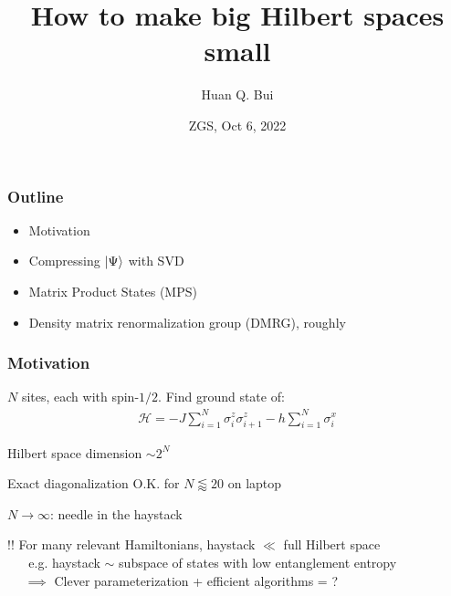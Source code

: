\documentclass{beamer}
\title[\textcolor{white}{{}}]
{
	How to make big Hilbert spaces small
}
\author[Bui] %
{Huan Q. Bui
	}
\institute[MIT] %
{
}
\date{ZGS, Oct 6, 2022}
\theoremstyle{definition}
\begin{document}
 
\frame{\titlepage}


\begin{frame}
	\frametitle{Outline}
	\begin{itemize}
		\item Motivation
		\item Compressing $\ket{\Psi}$ with SVD
		\item Matrix Product States (MPS)
		\item Density matrix renormalization group (DMRG), roughly
	\end{itemize}
\end{frame}


\begin{frame}
	\frametitle{Motivation}
	
	$N$ sites, each with spin-$1/2$. Find ground state of:
	\begin{align*}
		\mathcal{H} = - J \sum_{i=1}^N \sigma_i^z \sigma_{i+1}^z - h \sum_{i=1}^N \sigma^x_i
	\end{align*}	
	
	
	Hilbert space dimension $\sim 2^N$\\
	
	\vspace{10pt}
	
	Exact diagonalization O.K. for $N \lessapprox 20$ on laptop\\
	
	\vspace{10pt}
	
	$N \to \infty$: needle in the haystack\\
	
	\vspace{10pt}
	
	\pause
	
	{$\boxed{!!}$ For many relevant Hamiltonians, haystack $\ll$ full Hilbert space }\\
	\vspace{5pt}
	{$\quad\,\,\,\,$e.g. haystack $\sim$ subspace of states with low entanglement entropy }\\
	\vspace{5pt}
	{$\quad\,\,\implies$ Clever parameterization + efficient algorithms = \smiley{}?}
	
		
	
\end{frame}
\end{document}
